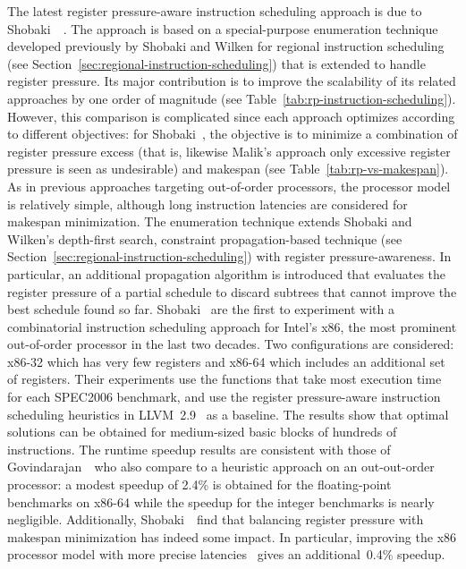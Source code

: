 \documentclass[acmsmall,authorversion,nonacm]{acmart}
\begin{document}
The latest register pressure-aware instruction scheduling approach is
due to Shobaki~\etal{}~\cite{Shobaki2013}.
The approach is based on a special-purpose enumeration technique
developed previously by Shobaki and Wilken for regional instruction
scheduling (see Section~\ref{sec:regional-instruction-scheduling})
that is extended to handle register pressure.
Its major contribution is to improve the scalability of its related
approaches by one order of magnitude (see
Table~\ref{tab:rp-instruction-scheduling}).
However, this comparison is complicated since each approach optimizes
according to different objectives: for Shobaki~\etal{}, the objective
is to minimize a combination of register pressure excess (that is,
likewise Malik's approach only excessive register pressure is seen as
undesirable) and makespan (see Table~\ref{tab:rp-vs-makespan}).
As in previous approaches targeting out-of-order processors, the
processor model is relatively simple, although long instruction
latencies are considered for makespan minimization.
The enumeration technique extends Shobaki and Wilken's depth-first
search, constraint propagation-based technique (see
Section~\ref{sec:regional-instruction-scheduling}) with register
pressure-awareness.
In particular, an additional propagation algorithm is introduced that
evaluates the register pressure of a partial schedule to discard
subtrees that cannot improve the best schedule found so far.
Shobaki~\etal{} are the first to experiment with a combinatorial
instruction scheduling approach for Intel's x86, the most prominent
out-of-order processor in the last two decades.
Two configurations are considered: x86-32 which has very few registers
and x86-64 which includes an additional set of registers.
Their experiments use the functions that take most execution time for
each SPEC2006 benchmark, and use the register pressure-aware
instruction scheduling heuristics in LLVM~2.9~\cite{Lattner2004} as a
baseline.
The results show that optimal solutions can be obtained for
medium-sized basic blocks of hundreds of instructions.
The runtime speedup results are consistent with those of
Govindarajan~\etal{}~who also compare to a heuristic approach on an
out-out-order processor: a modest speedup of 2.4\% is obtained for
the floating-point benchmarks on x86-64 while the speedup for the
integer benchmarks is nearly negligible.
Additionally, Shobaki~\etal{}~find that balancing register pressure
with makespan minimization has indeed some impact.
In particular, improving the x86 processor model with more precise
latencies~\cite{Fog2017} gives an additional~0.4\% speedup.
\end{document}
